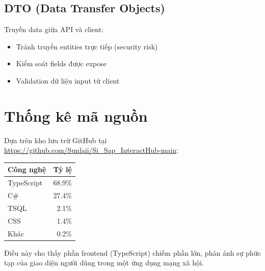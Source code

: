 \subsection{DTO (Data Transfer Objects)}
Truyền data giữa API và client:

\begin{itemize}
    \item Tránh truyền entities trực tiếp (security risk)
    \item Kiểm soát fields được expose
    \item Validation dữ liệu input từ client
\end{itemize}

\section{Thống kê mã nguồn}
Dựa trên kho lưu trữ GitHub tại \url{https://github.com/Sunlaii/Si_Sap_InteractHub-main}:

\begin{center}
\begin{tabular}{|l|r|}
\hline
\textbf{Công nghệ} & \textbf{Tỷ lệ} \\
\hline
TypeScript & 68.9\% \\
C\# & 27.4\% \\
TSQL & 2.1\% \\
CSS & 1.4\% \\
Khác & 0.2\% \\
\hline
\end{tabular}
\end{center}

Điều này cho thấy phần frontend (TypeScript) chiếm phần lớn, phản ánh sự phức tạp của giao diện người dùng trong một ứng dụng mạng xã hội.
